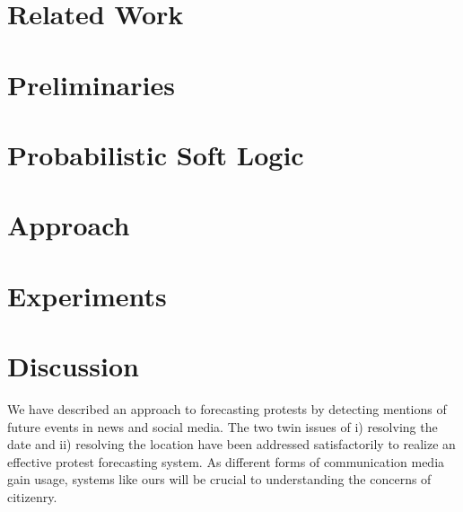 \documentclass[letterpaper]{article}
\begin{document}
\maketitle
\begin{abstract}
\begin{quote}

\end{quote}
\end{abstract}
\label{intro}

\vspace{-1.3em}
\section{Related Work}

\vspace{-2em}
\section{Preliminaries}

\vspace{-2em}
\section{Probabilistic Soft Logic}

\label{section:PSL}
\vspace{-1em}
\section{Approach}

\vspace{-2em}
\section{Experiments}

\vspace{-1em}
\section{Discussion}
We have described an approach to forecasting protests by detecting mentions of future events in news and social
media. The two twin issues of i) resolving the date and ii) resolving the location have been addressed satisfactorily
to realize an effective protest forecasting system. As different forms of communication media gain usage, systems
like ours will be crucial to understanding the concerns of citizenry.
\end{document}
